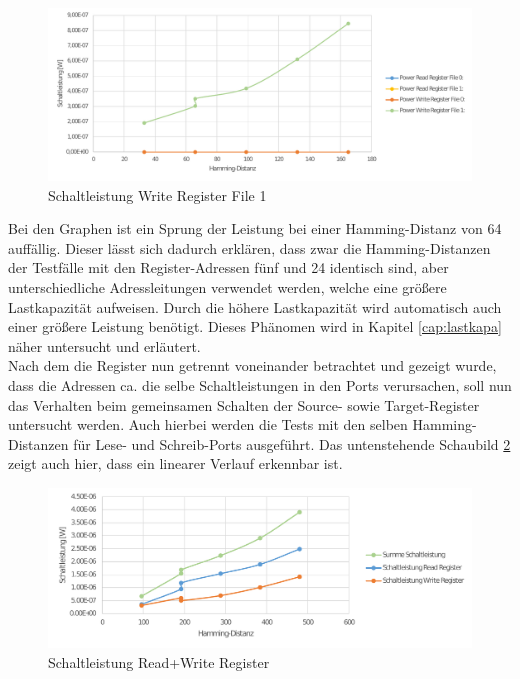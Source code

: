 \begin{figure}[H]
	\centering
	\includegraphics[width=\textwidth]{fig/register_eval_target_port1.pdf}
	\caption{Schaltleistung Write Register File 1}
	\label{fig:target1_power}
\end{figure}

Bei den Graphen ist ein Sprung der Leistung bei einer Hamming-Distanz von 64 auffällig. Dieser lässt sich dadurch erklären, dass zwar die Hamming-Distanzen der Testfälle mit den Register-Adressen fünf und 24 identisch sind, aber unterschiedliche Adressleitungen verwendet werden, welche eine größere Lastkapazität aufweisen. Durch die höhere Lastkapazität wird automatisch auch einer größere Leistung benötigt. Dieses Phänomen wird in Kapitel \ref{cap:lastkapa} näher untersucht und erläutert.\\

Nach dem die Register nun getrennt voneinander betrachtet und gezeigt wurde, dass die Adressen ca. die selbe Schaltleistungen in den Ports verursachen, soll nun das Verhalten beim gemeinsamen Schalten der Source- sowie Target-Register untersucht werden. Auch hierbei werden die Tests mit den selben Hamming-Distanzen für Lese- und Schreib-Ports ausgeführt. Das untenstehende Schaubild \ref{fig:source_target_power} zeigt auch hier, dass ein linearer Verlauf erkennbar ist.

\begin{figure}[H]
	\centering
	\includegraphics[width=\textwidth]{fig/source_target_power.pdf}
	\caption{Schaltleistung Read+Write Register}
	\label{fig:source_target_power}
\end{figure}

